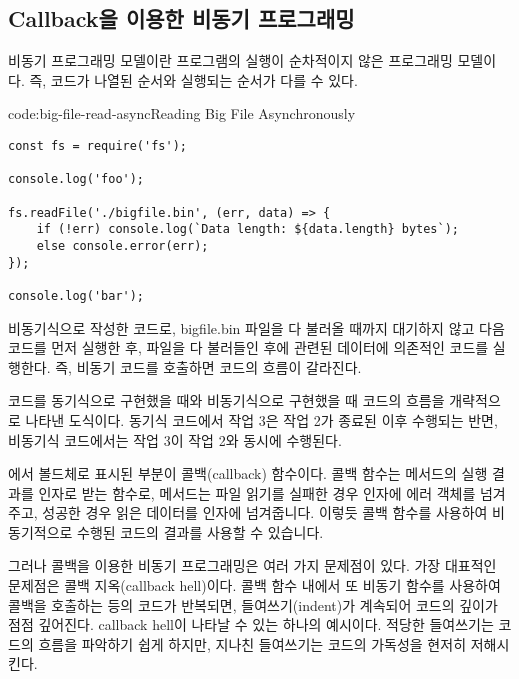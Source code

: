 \subsection*{Callback을 이용한 비동기 프로그래밍}

비동기 프로그래밍 모델이란 프로그램의 실행이 순차적이지 않은 프로그래밍 모델이다. 즉, 코드가 나열된 순서와 실행되는 순서가 다를 수 있다.

\begin{codeenv}{code:big-file-read-async}{Reading Big File Asynchronously}\begin{verbatim}
const fs = require('fs');

console.log('foo');

fs.readFile('./bigfile.bin', (err, data) => {
    if (!err) console.log(`Data length: ${data.length} bytes`);
    else console.error(err);
});

console.log('bar');
\end{verbatim}
\end{codeenv}

\는 \를 비동기식으로 작성한 코드로, bigfile.bin 파일을 다 불러올 때까지 대기하지 않고 다음 코드를 먼저 실행한 후, 파일을 다 불러들인 후에 관련된 데이터에 의존적인 코드를 실행한다. 즉, 비동기 코드를 호출하면 코드의 흐름이 갈라진다.


\는 코드를 동기식으로 구현했을 때와 비동기식으로 구현했을 때 코드의 흐름을 개략적으로 나타낸 도식이다. 동기식 코드에서 작업 3은 작업 2가 종료된 이후 수행되는 반면, 비동기식 코드에서는 작업 3이 작업 2와 동시에 수행된다.

에서 볼드체로 표시된 부분이 콜백(callback) 함수이다. 콜백 함수는 메서드의 실행 결과를 인자로 받는 함수로,  메서드는 파일 읽기를 실패한 경우  인자에 에러 객체를 넘겨주고, 성공한 경우 읽은 데이터를  인자에 넘겨줍니다. 이렇듯 콜백 함수를 사용하여 비동기적으로 수행된 코드의 결과를 사용할 수 있습니다. 

그러나 콜백을 이용한 비동기 프로그래밍은 여러 가지 문제점이 있다. 가장 대표적인 문제점은 콜백 지옥(callback hell)이다. 콜백 함수 내에서 또 비동기 함수를 사용하여 콜백을 호출하는 등의 코드가 반복되면, 들여쓰기(indent)가 계속되어 코드의 깊이가 점점 깊어진다. \은 callback hell이 나타날 수 있는 하나의 예시이다. 적당한 들여쓰기는 코드의 흐름을 파악하기 쉽게 하지만, 지나친 들여쓰기는 코드의 가독성을 현저히 저해시킨다. 


